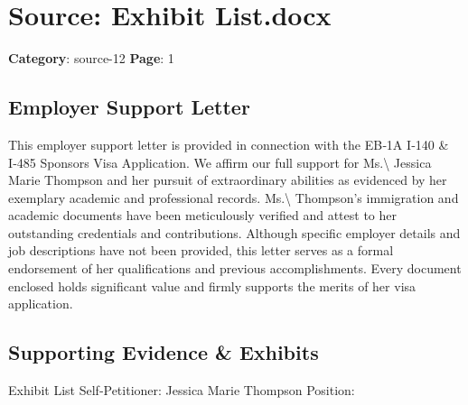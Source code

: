 \section*{Source: Exhibit List.docx}
\textbf{Category}: source-12
\textbf{Page}: 1

\subsection*{Employer Support Letter}

This employer support letter is provided in connection with the EB‑1A I‑140 \& I‑485 Sponsors Visa Application. We affirm our full support for Ms.\textbackslash{} Jessica Marie Thompson and her pursuit of extraordinary abilities as evidenced by her exemplary academic and professional records. Ms.\textbackslash{} Thompson’s immigration and academic documents have been meticulously verified and attest to her outstanding credentials and contributions. Although specific employer details and job descriptions have not been provided, this letter serves as a formal endorsement of her qualifications and previous accomplishments. Every document enclosed holds significant value and firmly supports the merits of her visa application.

\subsection*{Supporting Evidence \& Exhibits}

Exhibit List
Self‑Petitioner: Jessica Marie Thompson
Position:

